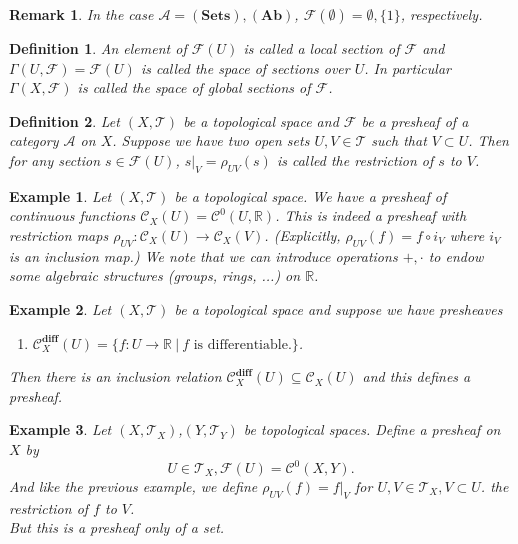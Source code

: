 \documentclass{article}
\newtheorem{definition}{Definition}[section]
\newtheorem{remark}{Remark}[section]
\newtheorem{example}{Example}[section]
\numberwithin{equation}{section}
\begin{document}
\begin{remark}
In the case $\mathcal{A} = (\mathbf{Sets}),(\mathbf{Ab})$, $\mathcal{F}(\emptyset)=\emptyset,\{1\}$, respectively.
\end{remark}

\begin{definition}
An element of $\mathcal{F}(U)$ is called a local section of $\mathcal{F}$ and $\Gamma(U,\mathcal{F}) = \mathcal{F}(U)$ is called the space of sections over $U$. In particular $\Gamma(X,\mathcal{F})$ is called the space of global sections of $\mathcal{F}$.
\end{definition}

\begin{definition}
Let $(X,\mathcal{T})$ be a topological space and $\mathcal{F}$ be a presheaf of a category $\mathcal{A}$ on $X$. Suppose we have two open sets $U,V\in\mathcal{T}$ such that $V\subset U$. Then for any section $s\in\mathcal{F}(U)$, $s|_V=\rho_{UV}(s)$ is called the restriction of $s$ to $V$.
\end{definition}

\begin{example}
Let $(X,\mathcal{T})$ be a topological space. We have a presheaf of continuous functions $\mathcal{C}_X(U)=\mathcal{C}^0(U,\mathbb{R})$. This is indeed a presheaf with restriction maps $\rho_{UV}:\mathcal{C}_X(U)\to\mathcal{C}_X(V)$. (Explicitly, $\rho_{UV}(f) = f\circ i_V$ where $i_V$ is an inclusion map.)  We note that we can introduce operations $+,\cdot$ to endow some algebraic structures (groups, rings, ...) on $\mathbb{R}$.
\end{example}

\begin{example}
Let $(X,\mathcal{T})$ be a topological space and suppose we have presheaves 
\begin{enumerate}[\textbullet]
\item $\mathcal{C}^{\textbf{diff}}_X(U) = \{f:U\to\mathbb{R}\:|\: f\text{ is differentiable.}\}$.
\end{enumerate}
Then there is an inclusion relation $\mathcal{C}^{\textbf{diff}}_X(U)\subseteq\mathcal{C}_X(U)$ and this defines a presheaf.
\end{example}

\begin{example}
Let $(X,\mathcal{T}_X)$,$(Y,\mathcal{T}_Y)$ be topological spaces. Define a presheaf on $X$ by 
\begin{equation*}
U\in\mathcal{T}_X, \mathcal{F}(U) = \mathcal{C}^0(X,Y).
\end{equation*}
And like the previous example, we define $\rho_{UV}(f) = f|_V$ for $U,V\in\mathcal{T}_X, V\subset U$. the restriction of $f$ to $V$. \\
But this is a presheaf only of a set. 
\end{example}
\end{document}
